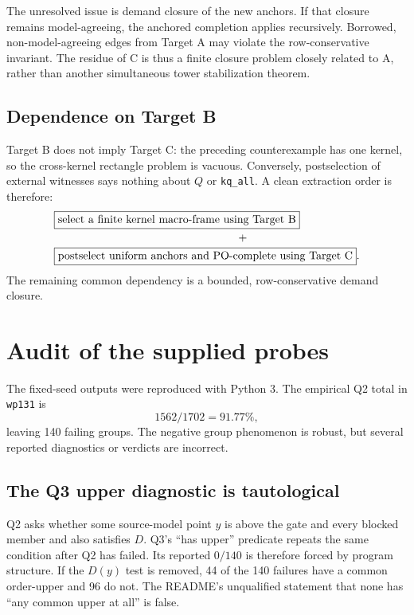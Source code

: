 \documentclass[11pt]{article}
\begin{document}
The unresolved issue is demand closure of the new anchors. If that closure remains
model-agreeing, the anchored completion applies recursively. Borrowed, non-model-agreeing
edges from Target A may violate the row-conservative invariant. The residue of C is thus a
finite closure problem closely related to A, rather than another simultaneous tower
stabilization theorem.

\subsection{Dependence on Target B}

Target B does not imply Target C: the preceding counterexample has one kernel, so the
cross-kernel rectangle problem is vacuous. Conversely, postselection of external witnesses
says nothing about $Q$ or \texttt{kq\_all}. A clean extraction order is therefore:
\begin{align*}
  &\boxed{\text{select a finite kernel macro-frame using Target B}}\\[-0.15em]
  &\hspace{0.48\linewidth}{+}\\[-0.15em]
  &\boxed{\text{postselect uniform anchors and PO-complete using Target C}}.
\end{align*}
The remaining common dependency is a bounded, row-conservative demand closure.

\section{Audit of the supplied probes}

The fixed-seed outputs were reproduced with Python 3. The empirical Q2 total in
\texttt{wp131} is
\[
  1562/1702=91.77\%,
\]
leaving 140 failing groups. The negative group phenomenon is robust, but several reported
diagnostics or verdicts are incorrect.

\subsection{The Q3 upper diagnostic is tautological}

Q2 asks whether some source-model point $y$ is above the gate and every blocked member and
also satisfies $D$. Q3's ``has upper'' predicate repeats the same condition after Q2 has
failed. Its reported $0/140$ is therefore forced by program structure. If the $D(y)$ test is
removed, 44 of the 140 failures have a common order-upper and 96 do not. The README's
unqualified statement that none has ``any common upper at all'' is false.
\end{document}

